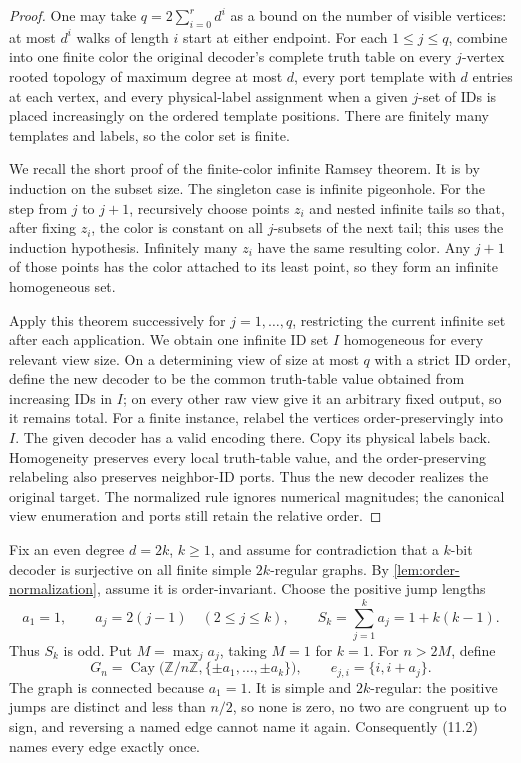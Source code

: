 \documentclass[11pt]{article}
\theoremstyle{definition}
\theoremstyle{remark}
\begin{document}
\begin{proof}
One may take $q=2\sum_{i=0}^r d^i$ as a bound on the number of visible
vertices: at most $d^i$ walks of length $i$ start at either endpoint.
For each $1\le j\le q$, combine into one finite color the original decoder's
complete truth table on every $j$-vertex rooted topology of maximum degree
at most $d$, every port template with $d$ entries at each vertex, and every
physical-label assignment when a given $j$-set of IDs is placed increasingly
on the ordered template positions.  There are finitely many templates and
labels, so the color set is finite.

We recall the short proof of the finite-color infinite Ramsey theorem.  It is
by induction on the subset size.  The singleton case is infinite pigeonhole.
For the step from $j$ to $j+1$, recursively choose points $z_i$ and nested
infinite tails so that, after fixing $z_i$, the color is constant on all
$j$-subsets of the next tail; this uses the induction hypothesis.  Infinitely
many $z_i$ have the same resulting color.  Any $j+1$ of those points has the
color attached to its least point, so they form an infinite homogeneous set.

Apply this theorem successively for $j=1,\ldots,q$, restricting the current
infinite set after each application.  We obtain one infinite ID set $I$
homogeneous for every relevant view size.  On a determining view
of size at most $q$ with a strict ID order, define the new decoder to be the
common truth-table value obtained from increasing IDs in $I$; on every other
raw view give it an arbitrary fixed output, so it remains total.  For a finite
instance, relabel the vertices order-preservingly into $I$.  The given decoder
has a valid encoding there.  Copy its physical labels back.  Homogeneity
preserves every local truth-table value, and the order-preserving relabeling
also preserves neighbor-ID ports.  Thus the new decoder realizes the original
target.  The normalized rule ignores numerical magnitudes; the canonical
view enumeration and ports still retain the relative order.
\end{proof}

Fix an even degree $d=2k$, $k\ge1$, and assume for contradiction that a
$k$-bit decoder is surjective on all finite simple $2k$-regular graphs.  By
\cref{lem:order-normalization}, assume it is order-invariant.  Choose the
positive jump lengths
\[
 a_1=1,\qquad a_j=2(j-1)\quad(2\le j\le k),
 \qquad S_k=\sum_{j=1}^k a_j=1+k(k-1).                      \tag{11.1}
\]
Thus $S_k$ is odd.  Put $M=\max_j a_j$, taking $M=1$ for $k=1$.  For
$n>2M$, define
\[
 G_n=\operatorname{Cay}\bigl(\mathbb Z/n\mathbb Z,
                    \{\pm a_1,\ldots,\pm a_k\}\bigr),
 \qquad e_{j,i}=\{i,i+a_j\}.                               \tag{11.2}
\]
The graph is connected because $a_1=1$.  It is simple and $2k$-regular:
the positive jumps are distinct and less than $n/2$, so none is zero, no two
are congruent up to sign, and reversing a named edge cannot name it again.
Consequently (11.2) names every edge exactly once.
\end{document}
